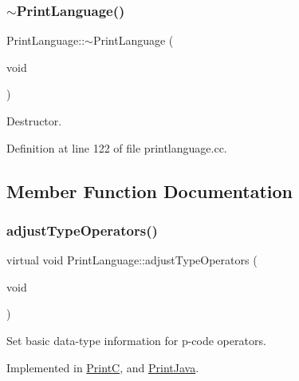 \subsubsection{\texorpdfstring{$\sim$PrintLanguage()}{~PrintLanguage()}}
{\footnotesize\ttfamily Print\+Language\+::$\sim$\+Print\+Language (\begin{DoxyParamCaption}\item[{void}]{ }\end{DoxyParamCaption})\hspace{0.3cm}{\ttfamily [virtual]}}



Destructor. 



Definition at line 122 of file printlanguage.\+cc.



\subsection{Member Function Documentation}
\mbox{\label{class_print_language_afe7b69e9583dfd99d310d7fbcb447986}} 
\subsubsection{\texorpdfstring{adjustTypeOperators()}{adjustTypeOperators()}}
{\footnotesize\ttfamily virtual void Print\+Language\+::adjust\+Type\+Operators (\begin{DoxyParamCaption}\item[{void}]{ }\end{DoxyParamCaption})\hspace{0.3cm}{\ttfamily [pure virtual]}}



Set basic data-\/type information for p-\/code operators. 



Implemented in \mbox{\hyperlink{class_print_c_abbafadf839747f44eca5cb9f30d2bd3c}{PrintC}}, and \mbox{\hyperlink{class_print_java_afcad564cec849b9f7d5ce1eaeb396c7d}{Print\+Java}}.

